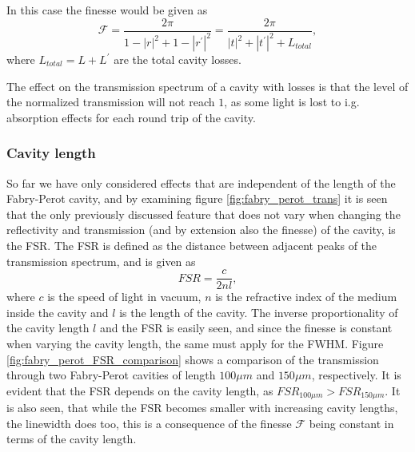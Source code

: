 In this case the finesse would be given as 
\begin{equation}
    \mathcal{F} = \frac{2 \pi}{1-|r|^2 + 1 - |r^{\prime}|^2} = \frac{2 \pi}{|t|^2 + |t^{\prime}|^2 + L_{total}},
\end{equation}
where $L_{total} = L + L^{\prime}$ are the total cavity losses.

The effect on the transmission spectrum of a cavity with losses is that the level of the normalized transmission will not reach $1$, as some light is lost to i.g. absorption effects for each round trip of the cavity.

\subsubsection{Cavity length}

So far we have only considered effects that are independent of the length of the Fabry-Perot cavity, and by examining figure \ref{fig:fabry_perot_trans} it is seen that the only previously discussed feature that does not vary when changing the reflectivity and transmission (and by extension also the finesse) of the cavity, is the FSR. The FSR is defined as the distance between adjacent peaks of the transmission spectrum, and is given as
\begin{equation}
    FSR = \frac{c}{2nl},
    \label{eq:FSR_formula}
\end{equation}
where $c$ is the speed of light in vacuum, $n$ is the refractive index of the medium inside the cavity and $l$ is the length of the cavity. The inverse proportionality of the cavity length $l$ and the FSR is easily seen, and since the finesse is constant when varying the cavity length, the same must apply for the FWHM. Figure \ref{fig:fabry_perot_FSR_comparison} shows a comparison of the transmission through two Fabry-Perot cavities of length $100\mu m$ and $150 \mu m$, respectively. It is evident that the FSR depends on the cavity length, as $FSR_{100 \mu m} > FSR_{150 \mu m}$. It is also seen, that while the FSR becomes smaller with increasing cavity lengths, the linewidth does too, this is a consequence of the finesse $\mathcal{F}$ being constant in terms of the cavity length. 

